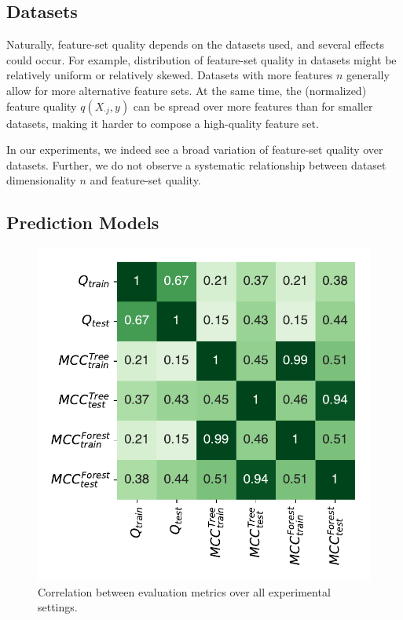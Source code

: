 \documentclass[conference]{IEEEtran}
\theoremstyle{definition}
\begin{document}
\subsection{Datasets}

Naturally, feature-set quality depends on the datasets used, and several effects could occur.
For example, distribution of feature-set quality in datasets might be relatively uniform or relatively skewed.
Datasets with more features $n$ generally allow for more alternative feature sets.
At the same time, the (normalized) feature quality $q(X_{\cdot{}j},y)$ can be spread over more features than for smaller datasets, making it harder to compose a high-quality feature set.

In our experiments, we indeed see a broad variation of feature-set quality over datasets.
Further, we do not observe a systematic relationship between dataset dimensionality $n$ and feature-set quality.

\subsection{Prediction Models}

\begin{figure}[t]
	\centering
	\includegraphics[width=\columnwidth, trim=0 15 0 15, clip]{plots/evaluation-metrics-correlation.pdf}
	\caption{Correlation between evaluation metrics over all experimental settings.}
	\label{fig:evaluation-metrics-correlation}
\end{figure}
\end{document}
